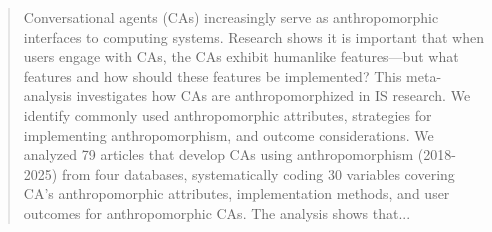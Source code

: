 \documentclass[manuscript,anonymous,sigconf]{acmart}
\begin{document}
\begin{abstract}
Conversational agents (CAs) increasingly serve as anthropomorphic interfaces to computing systems. Research shows it is important that when users engage with CAs, the CAs exhibit humanlike features---but what features and how should these features be implemented? This meta-analysis investigates how CAs are anthropomorphized in IS research. We identify commonly used anthropomorphic attributes, strategies for implementing anthropomorphism, and outcome considerations. We analyzed 79 articles that develop CAs using anthropomorphism (2018-2025) from four databases, systematically coding 30 variables covering CA's anthropomorphic attributes, implementation methods, and user outcomes for anthropomorphic CAs. The analysis shows that...
\end{abstract}



\end{document}
